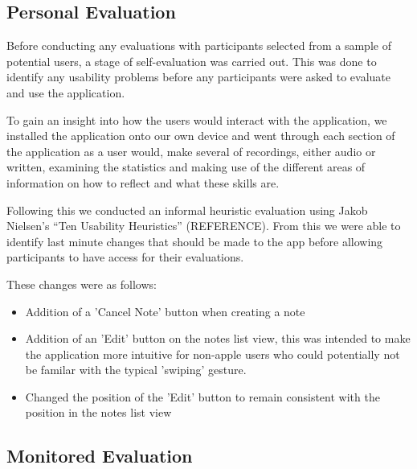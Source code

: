 \documentclass{l4proj}
\begin{document}
\subsection{Personal Evaluation}

Before conducting any evaluations with participants selected from a sample of potential users, a stage of self-evaluation
was carried out. This was done to identify any usability problems before any participants were asked to evaluate and use 
the application. 
\par 
To gain an insight into how the users would interact with the application, we installed the application onto our own device
and went through each section of the application as a user would, make several of recordings, either audio or written, 
examining the statistics and making use of the different areas of information on how to reflect and what these skills are.
\par 
Following this we conducted an informal heuristic evaluation using Jakob Nielsen’s “Ten Usability Heuristics” (REFERENCE). From this
we were able to identify last minute changes that should be made to the app before allowing participants to have 
access for their evaluations.
\par 
These changes were as follows:
\begin{itemize}
    \item Addition of a 'Cancel Note' button when creating a note
    \item Addition of an 'Edit' button on the notes list view, this was intended to make the application more intuitive
    for non-apple users who could potentially not be familar with the typical 'swiping' gesture.
    \item Changed the position of the 'Edit' button to remain consistent with the position in the notes list view
\end{itemize}


\subsection{Monitored Evaluation}
\end{document}
